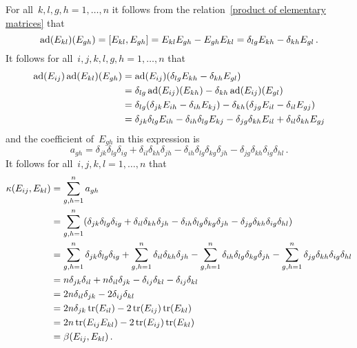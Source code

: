 \begin{example}
  For all~$k,l,g,h = 1, \dotsc, n$ it follows from the relation~\eqref{product of elementary matrices} that
  \[
    \operatorname{ad}(E_{kl})(E_{gh})
    =
    [E_{kl}, E_{gh}]
    =
    E_{kl} E_{gh} - E_{gh} E_{kl}
    =
    \delta_{lg} E_{kh} - \delta_{kh} E_{gl} \,.
  \]
  It follows for all~$i,j,k,l,g,h = 1, \dotsc, n$ that
  \begin{align*}
    \operatorname{ad}(E_{ij})\operatorname{ad}(E_{kl})(E_{gh})
    &=
    \operatorname{ad}(E_{ij})(\delta_{lg} E_{kh}
    - \delta_{kh} E_{gl})
    \\
    &=
    \delta_{lg} \operatorname{ad}(E_{ij})(E_{kh})
    - \delta_{kh} \operatorname{ad}(E_{ij})(E_{gl})
    \\
    &=
      \delta_{lg}(\delta_{jk} E_{ih}
    - \delta_{ih} E_{kj})
    - \delta_{kh}(\delta_{jg} E_{il}
    - \delta_{il} E_{gj})
    \\
    &=
      \delta_{jk} \delta_{lg} E_{ih}
    - \delta_{ih} \delta_{lg} E_{kj}
    - \delta_{jg} \delta_{kh} E_{il}
    + \delta_{il} \delta_{kh} E_{gj}
  \end{align*}
  and the coefficient of~$E_{gh}$ in this expression is
  \[
    a_{gh}
    =
      \delta_{jk} \delta_{lg} \delta_{ig}
    + \delta_{il} \delta_{kh} \delta_{jh}
    - \delta_{ih} \delta_{lg} \delta_{kg} \delta_{jh}
    - \delta_{jg} \delta_{kh} \delta_{ig} \delta_{hl} \,.
  \]
  It follows for all~$i,j,k,l = 1, \dotsc, n$ that
  \begin{align*}
    \kappa(E_{ij}, E_{kl})
    &=
    \sum_{g,h=1}^n a_{gh}
    \\
    &=
    \sum_{g,h=1}^n
    (
        \delta_{jk} \delta_{lg} \delta_{ig}
      + \delta_{il} \delta_{kh} \delta_{jh}
      - \delta_{ih} \delta_{lg} \delta_{kg} \delta_{jh}
      - \delta_{jg} \delta_{kh} \delta_{ig} \delta_{hl}
    )
    \\
    &=
      \sum_{g,h=1}^n \delta_{jk} \delta_{lg} \delta_{ig}
    + \sum_{g,h=1}^n \delta_{il} \delta_{kh} \delta_{jh}
    - \sum_{g,h=1}^n \delta_{ih} \delta_{lg} \delta_{kg} \delta_{jh}
    - \sum_{g,h=1}^n \delta_{jg} \delta_{kh} \delta_{ig} \delta_{hl}
    \\
    &=
      n \delta_{jk} \delta_{il}
    + n \delta_{il} \delta_{jk}
    - \delta_{ij} \delta_{kl}
    - \delta_{ij} \delta_{kl}
    \\
    &=
      2 n \delta_{il} \delta_{jk}
    - 2 \delta_{ij} \delta_{kl}
    \\
    &=
    2n \delta_{jk} \operatorname{tr}(E_{il})  - 2 \operatorname{tr}(E_{ij}) \operatorname{tr}(E_{kl})
    \\
    &=
    2n \operatorname{tr}(E_{ij} E_{kl}) - 2 \operatorname{tr}(E_{ij}) \operatorname{tr}(E_{kl})
    \\
    &=
    \beta(E_{ij}, E_{kl})  \,.
  \end{align*}
\end{example}



